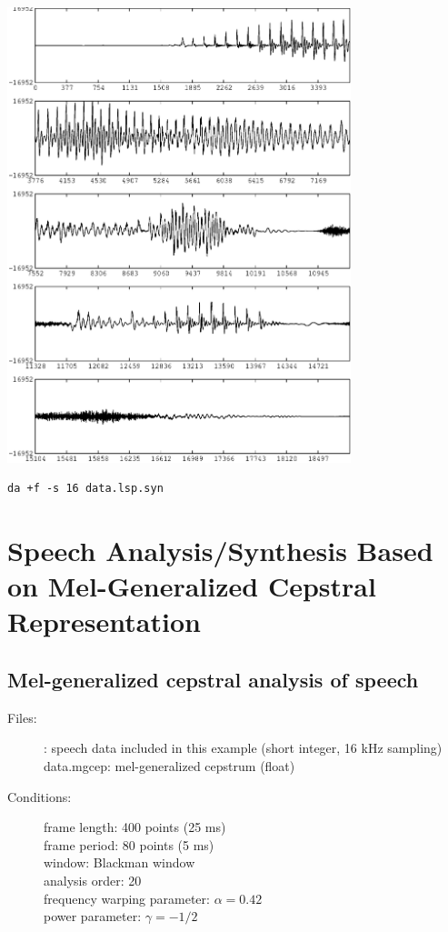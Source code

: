 \documentclass[a4paper,10pt]{article}
\begin{document}
\includegraphics[width=10cm]{eps/data.lsp.syn.gwave.eps}

\begin{verbatim}
da +f -s 16 data.lsp.syn
\end{verbatim}

\section{Speech Analysis/Synthesis 
        Based on Mel-Generalized Cepstral Representation}

\subsection{Mel-generalized cepstral analysis of speech}

\begin{description}
\item[Files:]
   :
           speech data included in this example (short integer, 16 kHz sampling)\\
   data.mgcep: mel-generalized cepstrum (float)
\item[Conditions:]
  frame length: 400 points (25 ms)\\
  frame period: 80 points (5 ms)\\
  window: Blackman window\\
  analysis order: 20\\
  frequency warping parameter: $\alpha = 0.42$\\
  power parameter:     $\gamma = -1/2$
\end{description}
\end{document}
